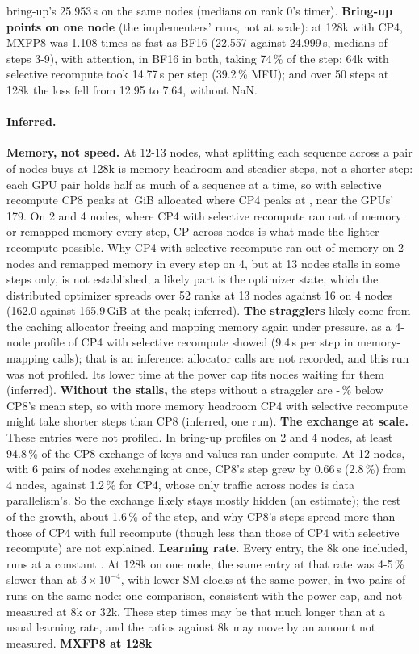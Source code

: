 bring-up's 25.953\,s on the same nodes (medians on rank 0's timer). \textbf{Bring-up points on one node} (the implementers' runs, not at scale): at 128k with CP4, MXFP8 was 1.108 times as fast as BF16 (22.557 against 24.999\,s, medians of steps 3-9), with attention, in BF16 in both, taking 74\,\% of the step; 64k with selective recompute took 14.77\,s per step (39.2\,\% MFU); and over 50 steps at 128k the loss fell from 12.95 to 7.64, without NaN.

\paragraph{Inferred.} \textbf{Memory, not speed.} At 12-13 nodes, what splitting each sequence across a pair of nodes buys at 128k is memory headroom and steadier steps, not a shorter step: each GPU pair holds half as much of a sequence at a time, so with selective recompute CP8 peaks at \TriQwCpMemCpEight\,GiB allocated where CP4 peaks at \TriQwCpMemCpFourSel, near the GPUs' 179. On 2 and 4 nodes, where CP4 with selective recompute ran out of memory or remapped memory every step, CP across nodes is what made the lighter recompute possible. Why CP4 with selective recompute ran out of memory on 2 nodes and remapped memory in every step on 4, but at 13 nodes stalls in some steps only, is not established; a likely part is the optimizer state, which the distributed optimizer spreads over 52 ranks at 13 nodes against 16 on 4 nodes (162.0 against 165.9\,GiB at the peak; inferred). \textbf{The stragglers} likely come from the caching allocator freeing and mapping memory again under pressure, as a 4-node profile of CP4 with selective recompute showed (9.4\,s per step in memory-mapping calls); that is an inference: allocator calls are not recorded, and this run was not profiled. Its lower time at the power cap fits nodes waiting for them (inferred). \textbf{Without the stalls,} the \TriQwCpCleanSteps{} steps without a straggler are \TriQwCpCleanBelowLo-\TriQwCpCleanBelowHi\,\% below CP8's mean step, so with more memory headroom CP4 with selective recompute might take shorter steps than CP8 (inferred, one run).  \textbf{The exchange at scale.} These entries were not profiled. In bring-up profiles on 2 and 4 nodes, at least 94.8\,\% of the CP8 exchange of keys and values ran under compute. At 12 nodes, with 6 pairs of nodes exchanging at once, CP8's step grew by 0.66\,s (2.8\,\%) from 4 nodes, against 1.2\,\% for CP4, whose only traffic across nodes is data parallelism's. So the exchange likely stays mostly hidden (an estimate); the rest of the growth, about 1.6\,\% of the step, and why CP8's steps spread more than those of CP4 with full recompute (though less than those of CP4 with selective recompute) are not explained. \textbf{Learning rate.} Every entry, the 8k one included, runs at a constant \TriQwCpLr. At 128k on one node, the same entry at that rate was 4-5\,\% slower than at $3\times10^{-4}$, with lower SM clocks at the same power, in two pairs of runs on the same node: one comparison, consistent with the power cap, and not measured at 8k or 32k. These step times may be that much longer than at a usual learning rate, and the ratios against 8k may move by an amount not measured. \textbf{MXFP8 at 128k} 